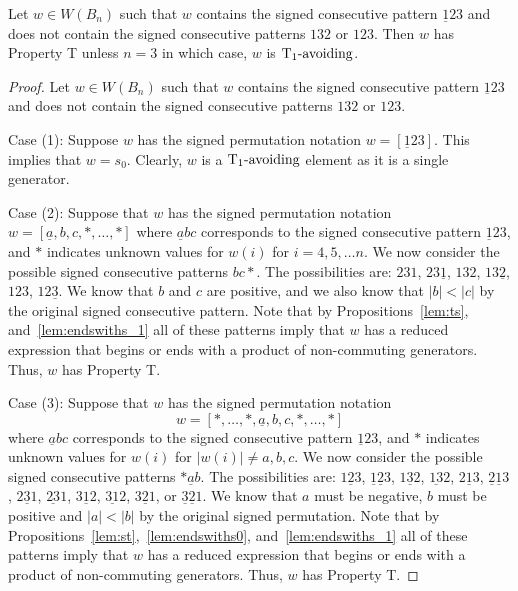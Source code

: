 \begin{proposition}\label{lem:123}
Let $w \in W(B_n)$ such that $w$ contains the signed consecutive pattern $\underline{1}23$ and does not contain the signed consecutive patterns $132$ or $123$. Then $w$ has Property T unless $n=3$ in which case, $w$ is $\operatorname{T_1-\mathrm{avoiding}}$.
\begin{proof}
	Let $w \in W(B_n)$ such that $w$ contains the signed consecutive pattern $\underline{1}23$ and does not contain the signed consecutive patterns $132$ or $123$.
	
	Case (1): Suppose $w$ has the signed permutation notation $w=[\underline{1}23]$. This implies that $w=s_0$. Clearly, $w$ is a $\operatorname{T_1-\mathrm{avoiding}}$ element as it is a single generator.
	
	Case (2): Suppose that $w$ has the signed permutation notation $w=[\underline{a},b,c, \ast, \ldots, \ast]$ where $\underline{a}bc$ corresponds to the signed consecutive pattern $\underline{1}23$, and $\ast$ indicates unknown values for $w(i)$ for $i=4,5, \ldots n$. We now consider the possible signed consecutive patterns $bc \ast$. The possibilities are: $231$, $23 \underline{1}$, $132$, $13 \underline{2}$, $123$, $12 \underline{3}$. We know that $b$ and $c$ are positive, and we also know that $|b|<|c|$ by the original signed consecutive pattern. Note that by Propositions~\ref{lem:ts}, and~\ref{lem:endswiths_1} all of these patterns imply that $w$ has a reduced expression that begins or ends with a product of non-commuting generators. Thus, $w$ has Property T.
	
	Case (3): Suppose that $w$ has the signed permutation notation \[w=[\ast, \ldots, \ast, \underline{a},b,c, \ast, \ldots, \ast]\] where $\underline{a}bc$ corresponds to the signed consecutive pattern $\underline{1}23$, and $\ast$ indicates unknown values for $w(i)$ for $|w(i)|\neq a,b,c$. We now consider the possible signed consecutive patterns $\ast \underline{a} b$. The possibilities are: $1 \underline{2} 3$, $\underline{1} \underline{2} 3$, $1\underline{3}2$, $\underline{13}2$,  $2 \underline{1} 3$, $\underline{2} \underline{1} 3$, $2 \underline{3}1$, $\underline{23}1$, $3 \underline{1}2$, $\underline{31}2$, $3 \underline{2} 1$, or $\underline{3} \underline{2} 1$. We know that $a$ must be negative, $b$ must be positive and $|a|<|b|$ by the original signed permutation. Note that by Propositions~\ref{lem:st},~\ref{lem:endswiths0}, and~\ref{lem:endswiths_1} all of these patterns imply that $w$ has a reduced expression that begins or ends with a product of non-commuting generators. Thus, $w$ has Property T. 
%	
\end{proof}	
\end{proposition}

